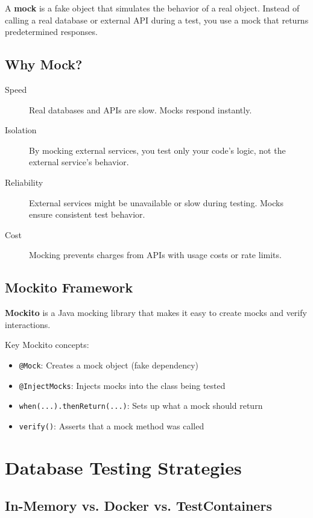 \documentclass[12pt,a4paper]{article}
\begin{document}
A \textbf{mock} is a fake object that simulates the behavior of a real object. Instead of calling a real database or external API during a test, you use a mock that returns predetermined responses.

\subsection{Why Mock?}

\begin{description}
    \item[Speed] Real databases and APIs are slow. Mocks respond instantly.
    \item[Isolation] By mocking external services, you test only your code's logic, not the external service's behavior.
    \item[Reliability] External services might be unavailable or slow during testing. Mocks ensure consistent test behavior.
    \item[Cost] Mocking prevents charges from APIs with usage costs or rate limits.
\end{description}

\subsection{Mockito Framework}

\textbf{Mockito} is a Java mocking library that makes it easy to create mocks and verify interactions.

\begin{importantbox}
Key Mockito concepts:
\begin{itemize}
    \item \texttt{@Mock}: Creates a mock object (fake dependency)
    \item \texttt{@InjectMocks}: Injects mocks into the class being tested
    \item \texttt{when(...).thenReturn(...)}: Sets up what a mock should return
    \item \texttt{verify()}: Asserts that a mock method was called
\end{itemize}
\end{importantbox}

\section{Database Testing Strategies}

\subsection{In-Memory vs. Docker vs. TestContainers}
\end{document}
